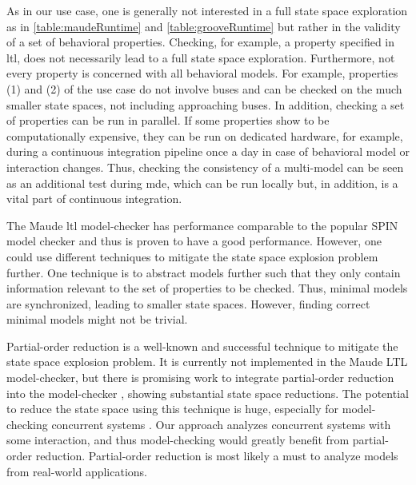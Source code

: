 \documentclass{jot}
\begin{document}
As in our use case, one is generally not interested in a full state space exploration as in \cref{table:maudeRuntime} and \cref{table:grooveRuntime} but rather in the validity of a set of behavioral properties.
Checking, for example, a property specified in \gls*{ltl}, does not necessarily lead to a full state space exploration.
Furthermore, not every property is concerned with all behavioral models.
For example, properties (1) and (2) of the use case do not involve buses and can be checked on the much smaller state spaces, not including approaching buses.
In addition, checking a set of properties can be run in parallel.
If some properties show to be computationally expensive, they can be run on dedicated hardware, for example, during a continuous integration pipeline once a day in case of behavioral model or interaction changes.
Thus, checking the consistency of a multi-model can be seen as an additional test during \gls*{mde}, which can be run locally but, in addition, is a vital part of continuous integration.

The Maude \gls*{ltl} model-checker has performance comparable to the popular SPIN model checker \cite{ekerMaudeLTLModel2004} and thus is proven to have a good performance.
However, one could use different techniques to mitigate the state space explosion problem further.
One technique is to abstract models further such that they only contain information relevant to the set of properties to be checked.
Thus, minimal models are synchronized, leading to smaller state spaces.
However, finding correct minimal models might not be trivial.

Partial-order reduction is a well-known and successful technique to mitigate the state space explosion problem.
It is currently not implemented in the Maude LTL model-checker, but there is promising work to integrate partial-order reduction into the model-checker \cite{farzanPartialOrderReduction2007}, showing substantial state space reductions.
The potential to reduce the state space using this technique is huge, especially for model-checking concurrent systems \cite{clarkeHandbookModelChecking2018}.
Our approach analyzes concurrent systems with some interaction, and thus model-checking would greatly benefit from partial-order reduction.
Partial-order reduction is most likely a must to analyze models from real-world applications.
\end{document}
